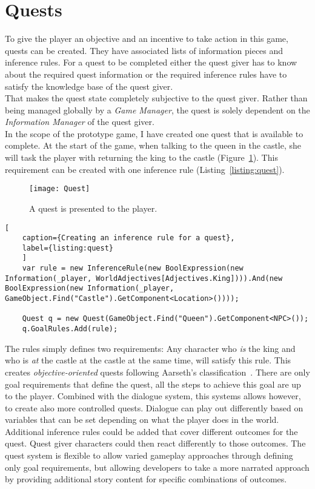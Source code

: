 \section{Quests}
To give the player an objective and an incentive to take action in this game, quests can be created. They have associated lists of information pieces and inference rules. For a quest to be completed either the quest giver has to know about the required quest information or the required inference rules have to satisfy the knowledge base of the quest giver.\\
That makes the quest state completely subjective to the quest giver. Rather than being managed globally by a \textit{Game Manager}, the quest is solely dependent on the \textit{Information Manager} of the quest giver.\\
In the scope of the prototype game, I have created one quest that is available to complete. At the start of the game, when talking to the queen in the castle, she will task the player with returning the king to the castle (Figure~\ref{fig:quest}). This requirement can be created with one inference rule (Listing~\ref{listing:quest}).
\begin{figure}
	\centering
	\texttt{[image: Quest]}
	\caption{A quest is presented to the player.}
	\label{fig:quest}
\end{figure}
\begin{lstlisting}[
	caption={Creating an inference rule for a quest},
	label={listing:quest}
	]
	var rule = new InferenceRule(new BoolExpression(new Information(_player, WorldAdjectives[Adjectives.King]))).And(new BoolExpression(new Information(_player, GameObject.Find("Castle").GetComponent<Location>())));
	
	Quest q = new Quest(GameObject.Find("Queen").GetComponent<NPC>());
	q.GoalRules.Add(rule);
\end{lstlisting}
The rules simply defines two requirements: Any character who \textit{is} the king and who is \textit{at} the castle at the castle at the same time, will satisfy this rule. This creates \textit{objective-oriented} quests following Aarseth's classification~\cite{Aarseth2005}. There are only goal requirements that define the quest, all the steps to achieve this goal are up to the player. Combined with the dialogue system, this systems allows however, to create also more controlled quests. Dialogue can play out differently based on variables that can be set depending on what the player does in the world. Additional inference rules could be added that cover different outcomes for the quest. Quest giver characters could then react differently to those outcomes. The quest system is flexible to allow varied gameplay approaches through defining only goal requirements, but allowing developers to take a more narrated approach by providing additional story content for specific combinations of outcomes.
